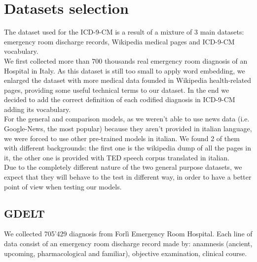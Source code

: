\chapter{Datasets selection}
The dataset used for the ICD-9-CM is a result of a mixture of 3 main datasets: emergency room discharge records, Wikipedia medical pages and ICD-9-CM vocabulary.\\
We first collected more than 700 thousands real emergency room diagnosis of an Hospital in Italy. As this dataset is still too small to apply word embedding, we enlarged the dataset with more medical data founded in Wikipedia health-related pages, providing some useful technical terms to our dataset. In the end we decided to add the correct definition of each codified diagnosis in ICD-9-CM adding its vocabulary.\\
For the general and comparison models, as we weren't able to use news data (i.e. Google-News, the most popular) because they aren't provided in italian language, we were forced to use other pre-trained models in italian. We found 2 of them with different backgrounds: the first one is the wikipedia dump of all the pages in it, the other one is provided with TED speech corpus translated in italian.\\
Due to the completely different nature of the two general purpose datasets, we expect that they will behave to the test in different way, in order to have a better point of view when testing our models.

\section{GDELT}

We collected 705'429 diagnosis from Forlì Emergency Room Hospital. Each line of data consist of an emergency room discharge record made by: anamnesis (ancient, upcoming, pharmacological and familiar), objective examination, clinical course.

